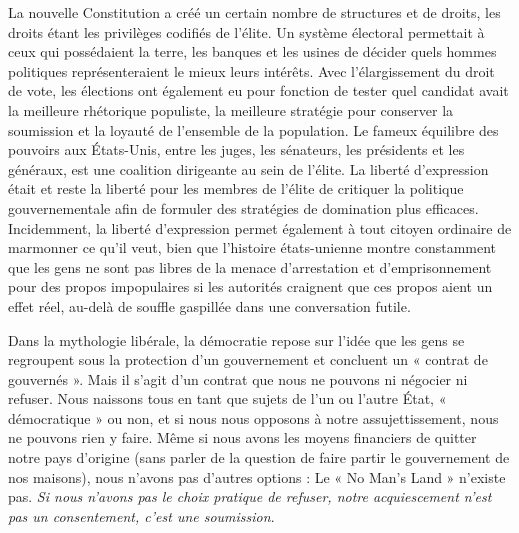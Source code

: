 La nouvelle Constitution a créé un certain nombre de structures et de droits, les droits étant les privilèges codifiés de l'élite. Un système électoral permettait à ceux qui possédaient la terre, les banques et les usines de décider quels hommes politiques représenteraient le mieux leurs intérêts. Avec l'élargissement du droit de vote, les élections ont également eu pour fonction de tester quel candidat avait la meilleure rhétorique populiste, la meilleure stratégie pour conserver la soumission et la loyauté de l'ensemble de la population. Le fameux équilibre des pouvoirs aux États-Unis, entre les juges, les sénateurs, les présidents et les généraux, est une coalition dirigeante au sein de l'élite. La liberté d'expression était et reste la liberté pour les membres de l'élite de critiquer la politique gouvernementale afin de formuler des stratégies de domination plus efficaces. Incidemment, la liberté d'expression permet également à tout citoyen ordinaire de marmonner ce qu'il veut, bien que l'histoire états-unienne montre constamment que les gens ne sont pas libres de la menace d'arrestation et d'emprisonnement pour des propos impopulaires si les autorités craignent que ces propos aient un effet réel, au-delà de souffle gaspillée dans une conversation futile.

Dans la mythologie libérale, la démocratie repose sur l'idée que les gens se regroupent sous la protection d'un gouvernement et concluent un « contrat de gouvernés ». Mais il s'agit d'un contrat que nous ne pouvons ni négocier ni refuser. Nous naissons tous en tant que sujets de l'un ou l'autre État, « démocratique » ou non, et si nous nous opposons à notre assujettissement, nous ne pouvons rien y faire. Même si nous avons les moyens financiers de quitter notre pays d'origine (sans parler de la question de faire partir le gouvernement de nos maisons), nous n'avons pas d'autres options : Le « No Man's Land » n'existe pas. \emph{Si nous n'avons pas le choix pratique de refuser, notre acquiescement n'est pas un consentement, c'est une soumission}.

